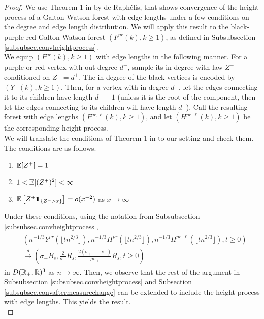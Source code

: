 \begin{proof}
We use Theorem 1 in \cite{deraphelisScalingLimitMultitype2017} by de Raphélis, that shows convergence of the height process of a Galton-Watson forest with edge-lengths under a few conditions on the degree and edge length distribution. We will apply this result to the black-purple-red Galton-Watson forest $(F^{pr}(k),k\geq 1)$, as defined in Subsubsection \ref{subsubsec.convheightprocess}. \\
We equip $(F^{pr}(k),k\geq 1)$ with edge lengths in the following manner. For a purple or red vertex with out degree $d^+$, sample its in-degree with law $Z^-$ conditioned on $Z^+=d^+$. The in-degree of the black vertices is encoded by $(Y^{-}(k),k\geq 1)$.  Then, for a vertex with in-degree $d^-$, let the edges connecting it to its children have length $d^--1$ (unless it is the root of the component, then let the edges connecting to its children will have length $d^-$). Call the resulting forest with edge lengths $(F^{pr,\ell}(k),k\geq 1)$, and let $(H^{pr,\ell}(k),k\geq 1)$ be the corresponding height process.\\
We will translate the conditions of Theorem 1 in \cite{deraphelisScalingLimitMultitype2017} to our setting and check them. The conditions are as follows.
\begin{enumerate}
    \item ${\mathbb E}[Z^+]=1$
    \item $1<{\mathbb E}[(Z^+)^2]<\infty$
    \item $\E\left[Z^+\one_{\{Z^->x\}}\right]=o(x^{-2})$ as $x\to \infty$
\end{enumerate}
Under these conditions, using the notation from Subsubsection \ref{subsubsec.convheightprocess},
\begin{align}\begin{split}\label{eq.convmodifiedheightprocess}
&\left(n^{-1/3}Y^{pr}\left(\lfloor t n^{2/3}\rfloor \right),n^{-1/3}H^{pr}\left(\lfloor t n^{2/3}\rfloor \right), n^{-1/3}H^{pr,\ell}\left(\lfloor t n^{2/3}\rfloor \right),t\geq 0\right)\\
&\overset{d}{\to}\left(\sigma_+ B_s, \frac{2}{\sigma_+}R_s, \frac{2(\sigma_{+-}+\nu_-)}{\mu\sigma_+}R_s,t\geq 0\right)
\end{split}\end{align}
in $D({\mathbb R}_+,{\mathbb R})^3$ as $n\to \infty$. 
Then, we observe that the rest of the argument in Subsubsection \ref{subsubsec.convheightprocess} and Subsection \ref{subsubsec.convaftermeasurechange} can be extended to include the height process with edge lengths. This yields the result.\\

\end{proof}
